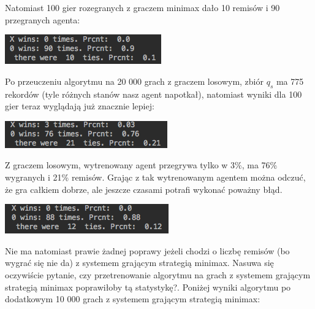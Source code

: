 \documentclass[licencjacka]{pracamgr}
\begin{document}
Natomiast 100 gier rozegranych z graczem minimax dało 10 remisów i 90 przegranych agenta:
\begin{flushleft}
	\includegraphics [scale=0.7]{QTable_vs_Minimax_untrained.png}
\end{flushleft}

Po przeuczeniu algorytmu na 20 000 grach z graczem losowym, zbiór $q_{s}$ ma 775 rekordów (tyle różnych stanów nasz agent napotkał), natomiast wyniki dla 100 gier teraz wyglądają już znacznie lepiej:
\begin{flushleft}
	\includegraphics [scale=0.7]{Qtable_vs_Rnd_trained.png}
\end{flushleft}
Z graczem losowym, wytrenowany agent przegrywa tylko w 3\%, ma 76\% wygranych i 21\% remisów. Grając z tak wytrenowanym agentem można odczuć, że gra całkiem dobrze, ale jeszcze czasami potrafi wykonać poważny błąd. \\

\begin{flushleft}
	\includegraphics [scale=0.7]{QTable_vs_Minimax_trained.png}
\end{flushleft}
Nie ma natomiast prawie żadnej poprawy jeżeli chodzi o liczbę remisów (bo wygrać się nie da) z systemem grającym strategią minimax. Nasuwa się oczywiście pytanie, czy przetrenowanie algorytmu na grach z systemem grającym strategią minimax poprawiłoby tą statystykę?. Poniżej wyniki algorytmu po dodatkowym 10 000 grach z systemem grającym strategią minimax:
\end{document}
